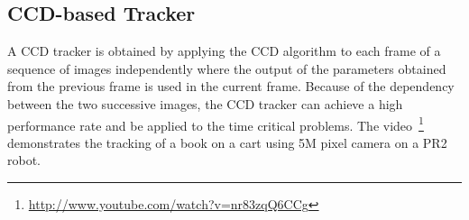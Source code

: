 \documentclass[conference]{IEEEtran}
\begin{document}
\subsection{CCD-based Tracker}
A CCD tracker is obtained by applying the CCD algorithm to each
frame of  a sequence of images independently where the output of the parameters 
obtained from the previous frame is used in the current frame. Because  of the 
dependency between the two successive images, the CCD tracker can achieve a high
performance rate and be applied to the time critical problems. The 
video~\footnote{\url{http://www.youtube.com/watch?v=nr83zqQ6CCg}} demonstrates the tracking of
a book on a cart using 5M pixel camera on a PR2 robot.
\end{document}
